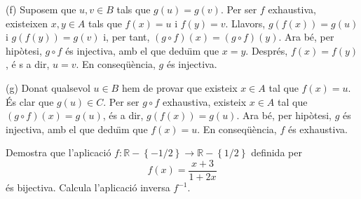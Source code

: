\begin{solucio}
(f) Suposem que $u,v\in B$ tals que $g(u)=g(v)$. Per ser $f$ exhaustiva,
existeixen $x,y\in A$ tals que $f(x)=u$ i $f(y)=v$. Llavors, $g\left(
f(x)\right) =g(u)$ i $g\left( f(y)\right) =g(v)$ i, per tant, $(g\circ
f)(x)=(g\circ f)(y)$. Ara b\'{e}, per hip\`{o}tesi, $g\circ f$ \'{e}s
injectiva, amb el que dedu\"{\i}m que $x=y$. Despr\'{e}s, $f(x)=f(y)$, \'{e}%
s a dir, $u=v$. En conseq\"{u}\`{e}ncia, $g$ \'{e}s injectiva.

(g) Donat qualsevol $u\in B$ hem de provar que existeix $x\in A$ tal que $%
f(x)=u$. \'{E}s clar que $g(u)\in C$. Per ser $g\circ f$ exhaustiva,
existeix $x\in A$ tal que $(g\circ f)(x)=g(u)$, \'{e}s a dir, $g\left(
f(x)\right) =g(u)$. Ara b\'{e}, per hip\`{o}tesi, $g$ \'{e}s injectiva, amb
el que dedu\"{\i}m que $f(x)=u$. En conseq\"{u}\`{e}ncia, $f$ \'{e}s
exhaustiva.
\end{solucio}

\begin{exer}
Demostra que l'aplicaci\'{o} $f:\mathbb{R}-\left\{ -1/2\right\}
\longrightarrow \mathbb{R}-\left\{ 1/2\right\} $ definida per%
\begin{equation*}
f(x)=\frac{x+3}{1+2x}
\end{equation*}%
\'{e}s bijectiva. Calcula l'aplicaci\'{o} inversa $f^{-1}$.
\end{exer}

